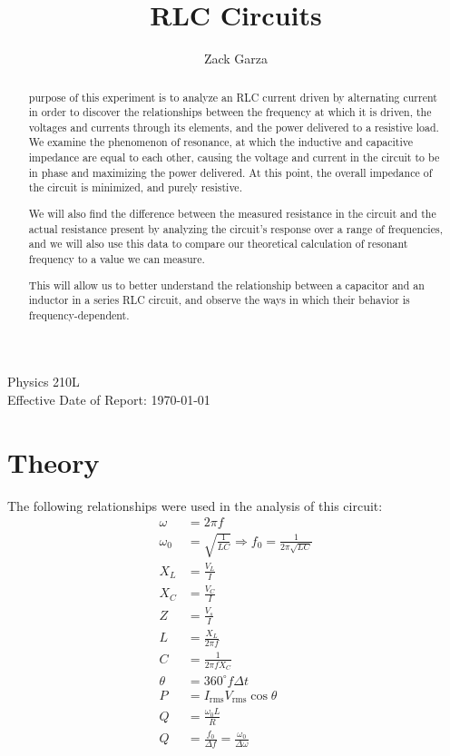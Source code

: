 \documentclass[twocolumn,english]{IEEEtran}
\newcommand{\thetitle}{RLC Circuits}
\newcommand{\theauthors}{Zack Garza}
\newcommand{\theclass}{Physics 210L}
\theoremstyle{plain}
\theoremstyle{plain}
\begin{document}
\title{\thetitle}
\author{\theauthors}
\IEEEspecialpapernotice
{\theclass \\ Effective Date of Report: \today }
\markboth{\thetitle}{\theauthors}
\maketitle

\begin{abstract}
 purpose of this experiment is to analyze an RLC current driven by alternating current in order to discover the relationships between the frequency at which it is driven, the voltages and currents through its elements, and the power delivered to a resistive load. We examine the phenomenon of resonance, at which the inductive and capacitive impedance are equal to each other, causing the voltage and current in the circuit to be in phase and maximizing the power delivered. At this point, the overall impedance of the circuit is minimized, and purely resistive.

We will also find the difference between the measured resistance in the circuit and the actual resistance present by analyzing the circuit's response over a range of frequencies, and we will also use this data to compare our theoretical calculation of resonant frequency to a value we can measure.

This will allow us to better understand the relationship between a capacitor and an inductor in a series RLC circuit, and observe the ways in which their behavior is frequency-dependent.
\end{abstract}

\tableofcontents

\section{Theory}

The following relationships were used in the analysis of this circuit:
\begin{align*}
	\omega &= 2\pi f \\
	\omega_0 &= \sqrt{\frac{1}{LC}} \Rightarrow f_0 = \frac{1}{2\pi\sqrt{LC}}\\
	X_L &= \frac{V_L}{I} \\
	X_C &= \frac{V_C}{I} \\
	Z &= \frac{V_s}{I} \\
	L &= \frac{X_L}{2\pi f} \\
	C &= \frac{1}{2\pi f X_C} \\
	\theta &= 360^{\circ} f\Delta t \\
	P &= I_{\text{rms}} V_{\text{rms}} \cos\theta \\
	Q &= \frac{\omega_0 L}{R} \\
	Q &= \frac{f_0}{\Delta f} = \frac{\omega_0}{\Delta \omega}
\end{align*}
\end{document}
